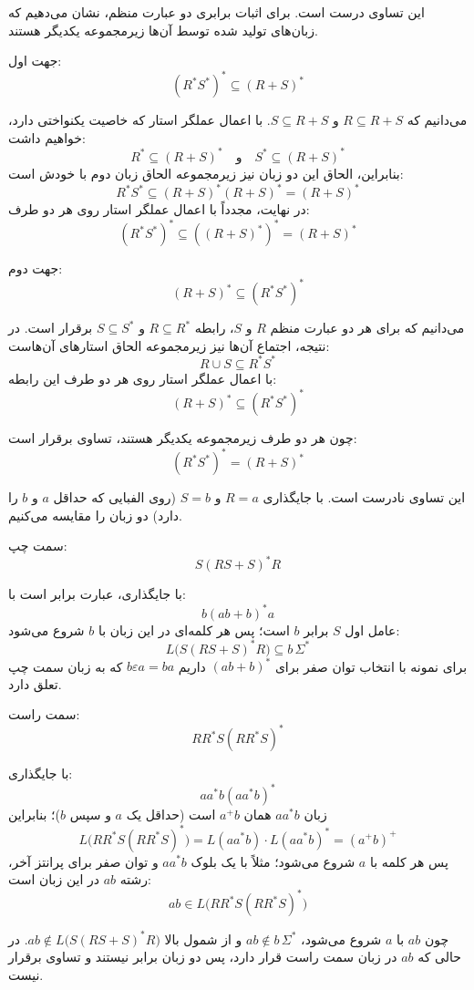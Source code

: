 
این تساوی {درست} است. برای اثبات برابری دو عبارت منظم، نشان می‌دهیم که زبان‌های تولید شده توسط آن‌ها زیرمجموعه یکدیگر هستند.

{جهت اول: \[(R^*S^*)^* \subseteq (R + S)^*\]}

می‌دانیم که \( R \subseteq R + S \) و \( S \subseteq R + S \).
     با اعمال عملگر استار که خاصیت یکنواختی دارد، خواهیم داشت:
    \[ R^* \subseteq (R + S)^* \quad \text{و} \quad S^* \subseteq (R + S)^* \]
     بنابراین، الحاق این دو زبان نیز زیرمجموعه الحاق زبان دوم با خودش است:
    \[ R^*S^* \subseteq (R + S)^*(R + S)^* = (R + S)^* \]
     در نهایت، مجدداً با اعمال عملگر استار روی هر دو طرف:
    \[ (R^*S^*)^* \subseteq ((R + S)^*)^* = (R + S)^* \]

{جهت دوم: \[(R + S)^* \subseteq (R^*S^*)^*\]}

     می‌دانیم که برای هر دو عبارت منظم \( R \) و \( S \)، رابطه \( R \subseteq R^* \) و \( S \subseteq S^* \) برقرار است.
     در نتیجه، اجتماع آن‌ها نیز زیرمجموعه الحاق استارهای آن‌هاست:
    \[ R \cup S \subseteq R^*S^* \]
     با اعمال عملگر استار روی هر دو طرف این رابطه:
    \[ (R + S)^* \subseteq (R^*S^*)^* \]

چون هر دو طرف زیرمجموعه یکدیگر هستند، تساوی برقرار است:
\[ (R^*S^*)^* = (R + S)^* \]



این تساوی {نادرست} است. با جایگذاری \( R = a \) و \( S = b \) (روی الفبایی که حداقل \( a \) و \( b \) را دارد) دو زبان را مقایسه می‌کنیم.

{سمت چپ: \[S(RS + S)^*R\]}

با جایگذاری، عبارت برابر است با:
    \[ b(ab + b)^*a \]
عامل اول \( S \) برابر \( b \) است؛ پس هر کلمه‌ای در این زبان با \( b \) {شروع} می‌شود:
    \[ L\bigl(S(RS + S)^*R\bigr) \subseteq b\,\Sigma^* \]
برای نمونه با انتخاب توان صفر برای \( (ab+b)^* \) داریم \( b\varepsilon a = ba \) که به زبان سمت چپ تعلق دارد.

{سمت راست: \[RR^*S(RR^*S)^*\]}

با جایگذاری:
    \[ aa^*b(aa^*b)^* \]
زبان \( aa^*b \) همان \( a^+b \) است (حداقل یک \( a \) و سپس \( b \))؛ بنابراین
    \[ L\bigl(RR^*S(RR^*S)^*\bigr) = L(aa^*b)\cdot L(aa^*b)^* = (a^+b)^+ \]
پس هر کلمه با \( a \) شروع می‌شود؛ مثلاً با یک بلوک \( aa^*b \) و توان صفر برای پرانتز آخر، رشته \( ab \) در این زبان است:
    \[ ab \in L\bigl(RR^*S(RR^*S)^*\bigr) \]

چون \( ab \) با \( a \) شروع می‌شود، \( ab \notin b\,\Sigma^* \) و از شمول بالا \( ab \notin L\bigl(S(RS + S)^*R\bigr) \). در حالی که \( ab \) در زبان سمت راست قرار دارد، پس دو زبان برابر نیستند و تساوی برقرار {نیست}.
